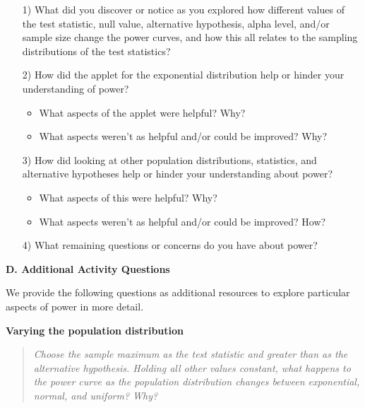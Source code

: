 \documentclass{TISE}
\begin{document}
\begin{enumerate}
	\item[1)] What did you discover or notice as you explored how different values of the test statistic, null value, alternative hypothesis, alpha level, and/or sample size change the power curves, and how this all relates to the sampling distributions of the test statistics? \vspace{.5in}
	
	\item[2)] How did the applet for the exponential distribution help or hinder your understanding of power?
	\begin{itemize}
		\item What aspects of the applet were helpful? Why?
		\item What aspects weren't as helpful and/or could be improved? Why?
	\end{itemize} 

	\vspace{.5in}
	
	\item[3)] How did looking at other population distributions, statistics, and alternative hypotheses help or hinder your understanding about power?
	\begin{itemize}
		\item What aspects of this were helpful? Why?
		\item What aspects weren't as helpful and/or could be improved? How?
	\end{itemize}

	\vspace{.5in}

	\item[4)] What remaining questions or concerns do you have about power? \vspace{.5in}
\end{enumerate}

\newpage

\begin{center}
	\textbf{\large D. Additional Activity Questions}
\end{center}

We provide the following questions as additional resources to explore particular aspects of power in more detail.

\textbf{Varying the population distribution}

\begin{quote}
	\textit{Choose the sample maximum as the test statistic and greater than as the alternative hypothesis. Holding all other values constant, what happens to the power curve as the population distribution changes between exponential, normal, and uniform? Why?}
\end{quote}
\end{document}
